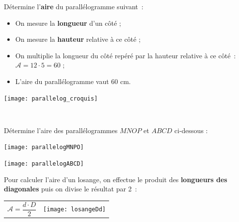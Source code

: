 \vspace{4em}

\begin{methode*1}


\begin{exemple*1}
Détermine l’\textbf{aire} du parallélogramme suivant :
\begin{minipage}[c]{0.65\textwidth}
\begin{itemize}
 \item On mesure la \textbf{\textcolor{H1}{longueur}} d'un côté ;
 \item On mesure la \textbf{\textcolor{C2}{hauteur}} relative à ce côté ;
 \item On multiplie la longueur du côté repéré par la hauteur relative à ce côté : $\mathcal{A} = 12 \cdot 5 = 60$ ;
 \item L'aire du parallélogramme vaut 60 cm.
 \end{itemize}
 \end{minipage} \hfill%
 \begin{minipage}[c]{0.26\textwidth}
 \texttt{[image: parallelog\_croquis]}
 \end{minipage} \\
\end{exemple*1}

\exercice 
Détermine l’aire des parallélogrammes $MNOP$ et $ABCD$ ci-dessous :
\begin{colenumerate}{2}
 \item 
 
 \texttt{[image: parallelogMNPO]}
 \item 
 
 \texttt{[image: parallelogABCD]}
 \end{colenumerate}

\end{methode*1}



\newpage

\vspace{2em}

\begin{aconnaitre}
Pour calculer l’aire d’un losange, on effectue le produit des \textbf{\textcolor{H1}{longueurs des diagonales}} puis on divise le résultat par 2 : 

\begin{tabularx}{\textwidth}{XX}
{\large $\mathcal{A} = \dfrac{d \cdot D}{2}$} & \texttt{[image: losangeDd]} \\
 \end{tabularx} \\
 \end{aconnaitre}

